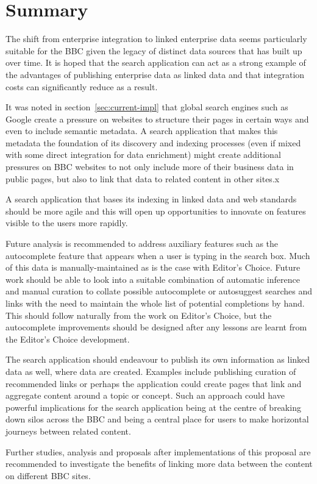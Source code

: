 \chapter{Summary}

The shift from enterprise integration to linked enterprise data
seems particularly suitable for the BBC given the legacy of
distinct data sources that has built up over time. It is hoped that
the search application can act as a strong example of the advantages
of publishing enterprise data as linked data and that integration
costs can significantly reduce as a result.

It was noted in section~\ref{sec:current-impl} that global search
engines such as Google create a pressure on websites to structure
their pages in certain ways and even to include semantic metadata. A
search application that makes this metadata the foundation of its
discovery and indexing processes (even if mixed with some direct integration
for data enrichment) might create additional pressures on BBC websites
to not only include more of their business data in public pages, but
also to link that data to related content in other sites.x

A search application that bases its indexing in linked data and
web standards should be more agile and this will open up opportunities
to innovate on features visible to the users more rapidly.

Future analysis is recommended to address auxiliary features such as
the autocomplete\cite{morville2010search} feature that appears when a user
is typing in
the search box. Much of this data is manually-maintained as is the case
with Editor's Choice. Future work should be able to look into a suitable
combination of automatic inference and manual curation to collate
possible autocomplete or autosuggest searches and links with the need to
maintain the whole list of potential completions by hand. This should follow
naturally from the work on Editor's Choice, but the autocomplete
improvements should
be designed after any lessons are learnt from the Editor's Choice development.

The search application should endeavour to publish its own information
as linked data as well, where data are created. Examples include publishing
curation of recommended links or perhaps the application could create
pages that link and aggregate content around a topic or concept. Such an
approach could have powerful implications for the search application being
at the centre of breaking down silos across the BBC and being a central
place for users to make horizontal journeys between related content.

Further studies, analysis and proposals after implementations of this proposal
are recommended to investigate the benefits of linking more data
between the content on different BBC sites.
